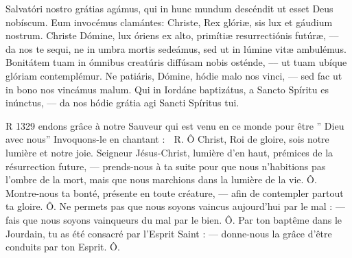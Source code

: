 \documentclass[RG2023_CarnetCommun.tex]{subfiles}
\begin{document}

Salvatóri nostro grátias agámus, qui in hunc mundum
descéndit ut esset Deus nobíscum. Eum invocémus
clamántes:
Christe, Rex glóriæ, sis lux et gáudium nostrum.
Christe Dómine, lux óriens ex alto, primítiæ resurrectiónis
futúræ,
–– da nos te sequi, ne in umbra mortis sedeámus, sed
ut in lúmine vitæ ambulémus.
Bonitátem tuam in ómnibus creatúris diffúsam nobis
osténde,
–– ut tuam ubíque glóriam contemplémur.
Ne patiáris, Dómine, hódie malo nos vinci,
–– sed fac ut in bono nos vincámus malum.
Qui in Iordáne baptizátus, a Sancto Spíritu es inúnctus,
–– da nos hódie grátia agi Sancti Spíritus tui.


R
1329
endons grâce à notre Sauveur
qui est venu en ce monde
pour être ” Dieu avec nous”
Invoquons-le en chantant :
􀀽 R. Ô Christ, Roi de gloire, sois
notre lumière et notre joie.
Seigneur Jésus-Christ, lumière
d’en haut, prémices de la résurrection
future, — prends-nous
à ta suite pour que nous n’habitions
pas l’ombre de la mort,
mais que nous marchions dans
la lumière de la vie. Ô.
Montre-nous ta bonté, présente
en toute créature, — afin de
contempler partout ta gloire. Ô.
Ne permets pas que nous soyons
vaincus aujourd’hui par le mal :
— fais que nous soyons vainqueurs
du mal par le bien. Ô.
Par ton baptême dans le Jourdain,
tu as été consacré par
l’Esprit Saint : — donne-nous la
grâce d’être conduits par ton Esprit.
Ô.

\end{document}
